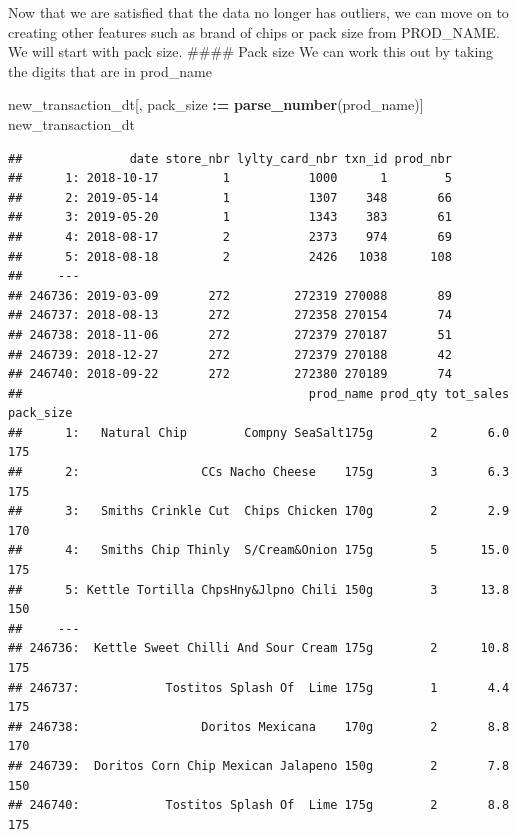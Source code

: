 \documentclass[
]{article}
\newenvironment{Shaded}{\begin{snugshade}}{\end{snugshade}}
\newcommand{\FunctionTok}[1]{\textcolor[rgb]{0.13,0.29,0.53}{\textbf{#1}}}
\newcommand{\NormalTok}[1]{#1}
\newcommand{\SpecialCharTok}[1]{\textcolor[rgb]{0.81,0.36,0.00}{\textbf{#1}}}
\begin{document}
Now that we are satisfied that the data no longer has outliers, we can
move on to creating other features such as brand of chips or pack size
from PROD\_NAME. We will start with pack size. \#\#\#\# Pack size We can
work this out by taking the digits that are in prod\_name

\begin{Shaded}
\begin{Highlighting}[]
\NormalTok{new\_transaction\_dt[, pack\_size }\SpecialCharTok{:=} \FunctionTok{parse\_number}\NormalTok{(prod\_name)]}
\NormalTok{new\_transaction\_dt}
\end{Highlighting}
\end{Shaded}

\begin{verbatim}
##               date store_nbr lylty_card_nbr txn_id prod_nbr
##      1: 2018-10-17         1           1000      1        5
##      2: 2019-05-14         1           1307    348       66
##      3: 2019-05-20         1           1343    383       61
##      4: 2018-08-17         2           2373    974       69
##      5: 2018-08-18         2           2426   1038      108
##     ---                                                    
## 246736: 2019-03-09       272         272319 270088       89
## 246737: 2018-08-13       272         272358 270154       74
## 246738: 2018-11-06       272         272379 270187       51
## 246739: 2018-12-27       272         272379 270188       42
## 246740: 2018-09-22       272         272380 270189       74
##                                        prod_name prod_qty tot_sales pack_size
##      1:   Natural Chip        Compny SeaSalt175g        2       6.0       175
##      2:                 CCs Nacho Cheese    175g        3       6.3       175
##      3:   Smiths Crinkle Cut  Chips Chicken 170g        2       2.9       170
##      4:   Smiths Chip Thinly  S/Cream&Onion 175g        5      15.0       175
##      5: Kettle Tortilla ChpsHny&Jlpno Chili 150g        3      13.8       150
##     ---                                                                      
## 246736:  Kettle Sweet Chilli And Sour Cream 175g        2      10.8       175
## 246737:            Tostitos Splash Of  Lime 175g        1       4.4       175
## 246738:                 Doritos Mexicana    170g        2       8.8       170
## 246739:  Doritos Corn Chip Mexican Jalapeno 150g        2       7.8       150
## 246740:            Tostitos Splash Of  Lime 175g        2       8.8       175
\end{verbatim}
\end{document}
